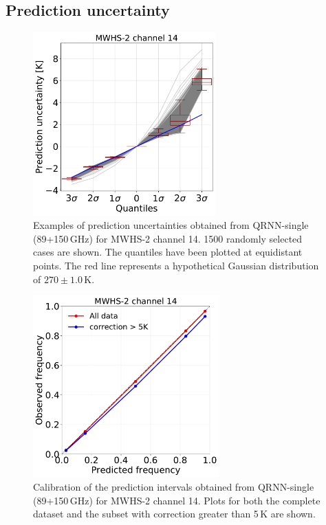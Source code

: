 \documentclass[amt, manuscript]{copernicus}
\begin{document}
\subsection{Prediction uncertainty}
\label{sec:uncertainty_mwhs}
\begin{figure}[t]
	\includegraphics[width = 70mm]{Figures/prediction_uncertainty_MWHS_14.pdf}	
	\caption{Examples of prediction uncertainties obtained from QRNN-single (89+150\,GHz) for MWHS-2 channel 14. 1500 randomly selected cases are shown. The quantiles have been plotted at equidistant points. The red line represents a hypothetical Gaussian distribution of $270\pm1.0$\,K.}
	\label{fig:prediction_uncertainty_mwhs}	
\end{figure}
\begin{figure}[t]
	\includegraphics[height = 70mm]{Figures/calibration_QRNN_MWHS_14.pdf}	
	\caption{Calibration of the prediction intervals obtained from QRNN-single (89+150\,GHz) for MWHS-2 channel 14. Plots for both the complete dataset and the subset with correction greater than 5\,K are shown. }
	\label{fig:calibration_mwhs}	
\end{figure}
\end{document}
